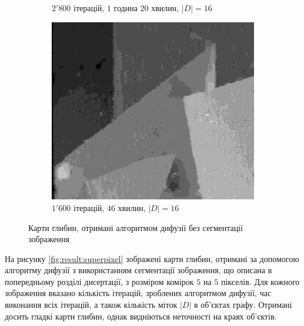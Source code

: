 \begin{figure}[h]
\begin{subfigure}[t]{0.32\textwidth}
        \caption{$2'800$ ітерацій, $1$ година $20$ хвилин, $\left| D \right| = 16$}
        \label{fig:flowerpots:pixel}
    \end{subfigure}
    \hfill
    \begin{subfigure}[t]{0.32\textwidth}
        \centering
        \includegraphics[width=\textwidth]{images/poster_pixel_based_stereo}
        \caption{$1'600$ ітерацій, $46$ хвилин, $\left| D \right| = 16$}
        \label{fig:poster:pixel}
    \end{subfigure}
    \caption{Карти глибин, отримані алгоритмом дифузії без сегментації зображення}
    \label{fig:result:pixel}
\end{figure}

На рисунку \ref{fig:result:superpixel} зображені карти глибин,
отримані за допомогою алгоритму дифузії з використанням сегментації зображення,
що описана в попередньому розділі дисертації,
з розміром комірок $5$ на $5$ пікселів.
Для кожного зображення вказано кількість ітерацій, зроблених алгоритмом дифузії,
час виконання всіх ітерацій, а також кількість міток $\left| D \right|$ в об'єктах графу.
Отримані досить гладкі карти глибин,
однак видніються неточності на краях об'єктів.


